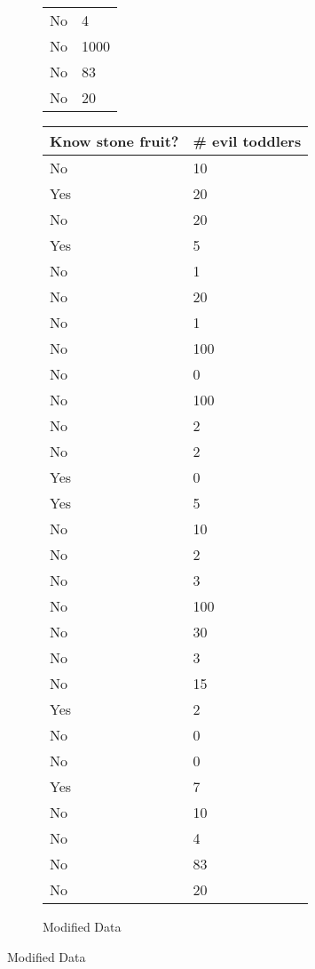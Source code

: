 \documentclass{article}
\begin{document}
\begin{figure}
\begin{subfigure}{.5\textwidth}
\begin{tabular}{p{3cm}|p{3cm}}
            No & 4 \\
            No & 1000 \\
            No & 83 \\
            No & 20 \\
        \end{tabular}
    \end{subfigure}%
    \begin{subfigure}{.5\textwidth}
        \centering
        \label{fig:original}
        \caption{Modified Data}
        \begin{tabular}{p{3cm}|p{3cm}}
            \toprule
            Know stone fruit? & \# evil toddlers \\
            \midrule
            No & 10 \\
            Yes & 20 \\
            No & 20 \\
            Yes & 5 \\
            No & 1 \\
            No & 20 \\
            No & 1 \\
            No & 100 \\
            No & 0 \\
            No & 100 \\
            No & 2 \\
            No & 2 \\
            Yes & 0 \\
            Yes & 5 \\
            No & 10 \\
            No & 2 \\
            No & 3 \\
            No & 100 \\
            No & 30 \\
            No & 3 \\
            No & 15 \\
            Yes & 2 \\
            No & 0 \\
            No & 0 \\
            Yes & 7 \\
            No & 10 \\
            No & 4 \\
            No & 83 \\
            No & 20 \\
        \end{tabular}
    \end{subfigure}%
\end{figure}
\end{document}
